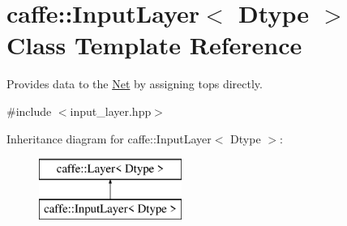 \hypertarget{classcaffe_1_1InputLayer}{}\section{caffe\+:\+:Input\+Layer$<$ Dtype $>$ Class Template Reference}
\label{classcaffe_1_1InputLayer}


Provides data to the \hyperlink{classcaffe_1_1Net}{Net} by assigning tops directly.  




{\ttfamily \#include $<$input\+\_\+layer.\+hpp$>$}

Inheritance diagram for caffe\+:\+:Input\+Layer$<$ Dtype $>$\+:\begin{figure}[H]
\begin{center}
\leavevmode
\includegraphics[height=2.000000cm]{classcaffe_1_1InputLayer}
\end{center}
\end{figure}
